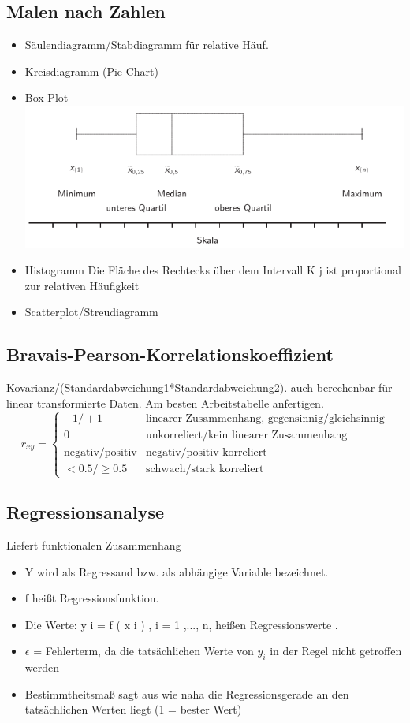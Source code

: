 \documentclass[10pt,a4paper]{article}
\begin{document}
	\subsection{Malen nach Zahlen}
	\begin{itemize}
		\item Säulendiagramm/Stabdiagramm für relative Häuf.
		\item Kreisdiagramm (Pie Chart)
		\item Box-Plot\\ \includegraphics[scale=0.3]{boxplot.png}
		\item Histogramm Die Fläche des Rechtecks über dem Intervall K j ist proportional zur relativen Häufigkeit
		\item Scatterplot/Streudiagramm
	\end{itemize}
	 \subsection{Bravais-Pearson-Korrelationskoeffizient}
	 Kovarianz/(Standardabweichung1*Standardabweichung2). auch berechenbar für linear transformierte Daten. Am besten Arbeitstabelle anfertigen.\\
	 \begin{equation}
	 r_{xy} =
	 \begin{cases}
	 -1/+1 & \text {linearer Zusammenhang, gegensinnig/gleichsinnig} \\
	 0 & \text{unkorreliert/kein linearer Zusammenhang} \\
	 \text{negativ/positiv} & \text{negativ/positiv korreliert}  \\
	 <0.5/\geq 0.5 & \text{schwach/stark korreliert}
	 \end{cases}
	 \end{equation}
	 \subsection{Regressionsanalyse}
	 Liefert funktionalen Zusammenhang 
	 \begin{itemize}
	   \item Y wird als Regressand bzw. als abhängige Variable bezeichnet.
	   \item f heißt Regressionsfunktion.
	   \item Die Werte: y i = f ( x i ) , i = 1 ,..., n, heißen Regressionswerte .
	   \item $\epsilon$ =  Fehlerterm, da die tatsächlichen Werte von $y_i$ in der Regel nicht getroffen werden
		\item Bestimmtheitsmaß sagt aus wie naha die Regressionsgerade an den tatsächlichen Werten liegt (1 = bester Wert)	
	 \end{itemize}
	
\end{document}
